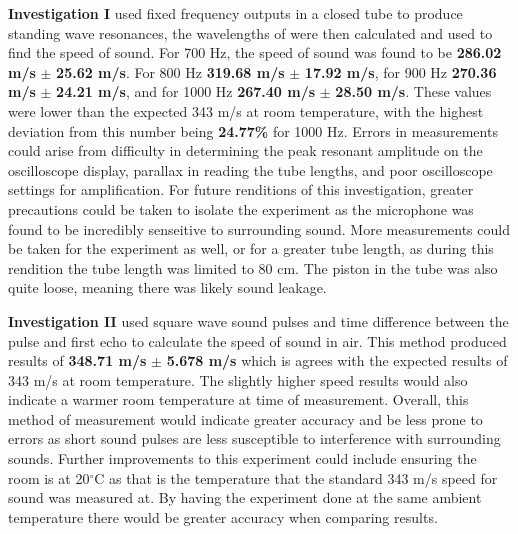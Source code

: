\documentclass[12pt]{article}
\begin{document}
\textbf{Investigation I} used fixed frequency outputs in a closed tube to produce standing wave resonances, the wavelengths of were then calculated and used to find the speed of sound.
For 700 Hz, the speed of sound was found to be \textbf{286.02 m/s} $\mathbf{\pm}$ \textbf{25.62 m/s}. For 800 Hz \textbf{319.68 m/s} $\mathbf{\pm}$ \textbf{17.92 m/s},
for 900 Hz \textbf{270.36 m/s} $\mathbf{\pm}$ \textbf{24.21 m/s}, and for 1000 Hz \textbf{267.40 m/s} $\mathbf{\pm}$ \textbf{28.50 m/s}. These values were lower than the expected 343 m/s at room temperature, with
the highest deviation from this number being \textbf{24.77\%} for 1000 Hz. Errors in measurements could arise from difficulty in determining the peak resonant amplitude on the oscilloscope display, parallax in reading the tube lengths, and poor
oscilloscope settings for amplification. For future renditions of this investigation, greater precautions could be taken to isolate the experiment as the microphone was found to be incredibly senseitive to surrounding sound. More measurements could be taken for
the experiment as well, or for a greater tube length, as during this rendition the tube length was limited to 80 cm. The piston in the tube was also quite loose, meaning there was likely sound leakage.

\textbf{Investigation II} used square wave sound pulses and time difference between the pulse and first echo to calculate the speed of sound in air. This method produced results of \textbf{348.71 m/s} $\mathbf{\pm}$ \textbf{5.678 m/s} which
is agrees with the expected results of 343 m/s at room temperature. The slightly higher speed results would also indicate a warmer room temperature at time of measurement. Overall, this method of measurement would indicate greater accuracy and be less prone to errors as short sound
pulses are less susceptible to interference with surrounding sounds. Further improvements to this experiment could include ensuring the room is at 20$^{\circ}$C as that is the temperature that the standard 343 m/s speed for sound was measured at. By having the experiment done at the same ambient temperature
there would be greater accuracy when comparing results.

\newpage



 \label{sec:ref}

\vspace{1.5cm}

\listoffigures
\end{document}
